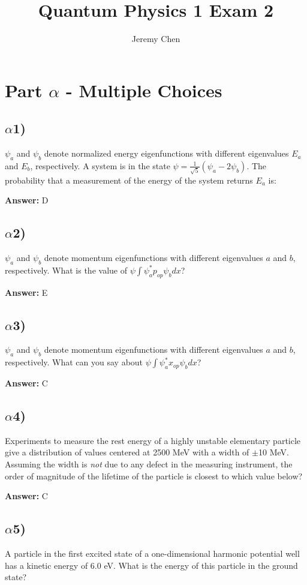 \documentclass[10pt,letterpaper]{article}
\title{Quantum Physics 1 Exam 2}
\author{Jeremy Chen}
\begin{document}
	\maketitle
\section*{Part $\alpha$ - Multiple Choices}
\subsection*{$\alpha$1)}
\noindent $\psi_{a}$ and $\psi_{b}$ denote normalized energy eigenfunctions with different eigenvalues $E_{a}$ and $E_{b}$, respectively. A system is in the state $\psi = \frac{1}{\sqrt{5}}(\psi_{a} - 2\psi_{b})$. The probability that a measurement of the energy of the system returns $E_{a}$ is:

\textbf{Answer: }D
\subsection*{$\alpha$2)}
\noindent $\psi_{a}$ and $\psi_{b}$ denote momentum eigenfunctions with different eigenvalues $a$ and $b$, respectively. What is the value of $\psi \int \psi_{a}^{*} p_{op} \psi_{b}dx$?

\textbf{Answer: }E
\subsection*{$\alpha$3)}
\noindent $\psi_{a}$ and $\psi_{b}$ denote momentum eigenfunctions with different eigenvalues $a$ and $b$, respectively. What can you say about $\psi \int \psi_{a}^{*} x_{op} \psi_{b}dx$?

\textbf{Answer: }C
\subsection*{$\alpha$4)}
\noindent Experiments to measure the rest energy of a highly unstable elementary particle give a distribution of values centered at 2500 MeV with a width of $\pm$10 MeV. Assuming the width is \textit{not} due to any defect in the measuring instrument, the order of magnitude of the lifetime of the particle is closest to which value below?

\textbf{Answer: }C
\subsection*{$\alpha$5)}
\noindent A particle in the first excited state of a one-dimensional harmonic potential well has a kinetic energy of 6.0 eV. What is the energy of this particle in the ground state? 
\end{document}
